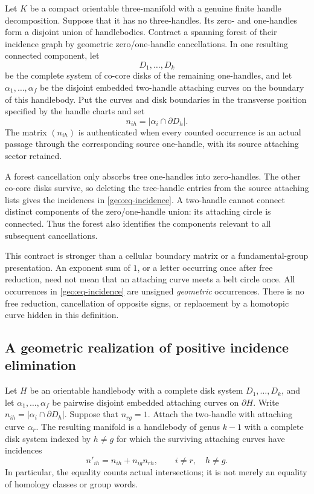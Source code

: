 \begin{definition}
\label{geo:def-incidence}
Let $K$ be a compact orientable three-manifold with a genuine finite handle
decomposition.  Suppose that it has no three-handles.  Its zero- and
one-handles form a disjoint union of handlebodies.  Contract a spanning
forest of their incidence graph by geometric zero/one-handle cancellations.
In one resulting connected component, let
\[
 D_1,\ldots,D_k
\]
be the complete system of co-core disks of the remaining one-handles, and
let $\alpha_1,\ldots,\alpha_f$ be the disjoint embedded two-handle attaching
curves on the boundary of this handlebody.  Put the curves and disk
boundaries in the transverse position specified by the handle charts and
set
\[
 n_{ih}=\bigl|\alpha_i\cap\partial D_h\bigr|.
 \tag{G1}\label{geo:eq-incidence}
\]
The matrix $(n_{ih})$ is authenticated when every counted occurrence is an
actual passage through the corresponding source one-handle, with its
source attaching sector retained.
\end{definition}

A forest cancellation only absorbs tree one-handles into zero-handles.
The other co-core disks survive, so deleting the tree-handle entries from
the source attaching lists gives the incidences in
\eqref{geo:eq-incidence}.  A two-handle cannot connect distinct components
of the zero/one-handle union: its attaching circle is connected.  Thus the
forest also identifies the components relevant to all subsequent
cancellations.

This contract is stronger than a cellular boundary matrix or a
fundamental-group presentation.  An exponent sum of $1$, or a letter
occurring once after free reduction, need not mean that an attaching curve
meets a belt circle once.  All occurrences in
\eqref{geo:eq-incidence} are unsigned \emph{geometric} occurrences.  There
is no free reduction, cancellation of opposite signs, or replacement by a
homotopic curve hidden in this definition.

\subsection{A geometric realization of positive incidence elimination}
\label{geo:slides}

\begin{lemma}
\label{geo:lem-slide}
Let $H$ be an orientable handlebody with a complete disk system
$D_1,\ldots,D_k$, and let $\alpha_1,\ldots,\alpha_f$ be pairwise disjoint
embedded attaching curves on $\partial H$.  Write
$n_{ih}=|\alpha_i\cap\partial D_h|$.  Suppose that $n_{rg}=1$.
Attach the two-handle with attaching curve $\alpha_r$.  The resulting
manifold is a handlebody of genus $k-1$ with a complete disk system indexed
by $h\ne g$ for which the surviving attaching curves have incidences
\[
 n'_{ih}=n_{ih}+n_{ig}n_{rh},
 \qquad i\ne r,\quad h\ne g.
 \tag{G2}\label{geo:eq-positive-pivot}
\]
In particular, the equality counts actual intersections; it is not merely
an equality of homology classes or group words.
\end{lemma}

